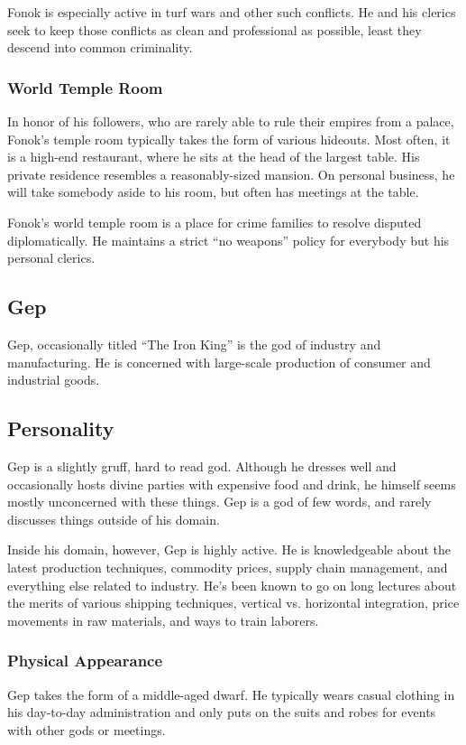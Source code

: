 Fonok is especially active in turf wars and other such conflicts.
He and his clerics seek to keep those conflicts as clean and professional as possible, least they descend into common criminality.

\subsubsection*{World Temple Room}
In honor of his followers, who are rarely able to rule their empires from a palace, Fonok's temple room typically takes the form of various hideouts.
Most often, it is a high-end restaurant, where he sits at the head of the largest table.
His private residence resembles a reasonably-sized mansion.
On personal business, he will take somebody aside to his room, but often has meetings at the table.

Fonok's world temple room is a place for crime families to resolve disputed diplomatically.
He maintains a strict ``no weapons'' policy for everybody but his personal clerics.

\subsection*{Gep}
\begin{goddesc}
\end{goddesc}

Gep, occasionally titled ``The Iron King'' is the god of industry and manufacturing.
He is concerned with large-scale production of consumer and industrial goods.

\subsection*{Personality}
Gep is a slightly gruff, hard to read god.
Although he dresses well and occasionally hosts divine parties with expensive food and drink, he himself seems mostly unconcerned with these things.
Gep is a god of few words, and rarely discusses things outside of his domain.

Inside his domain, however, Gep is highly active.
He is knowledgeable about the latest production techniques, commodity prices, supply chain management, and everything else related to industry.
He's been known to go on long lectures about the merits of various shipping techniques, vertical vs. horizontal integration, price movements in raw materials, and ways to train laborers.

\subsubsection*{Physical Appearance}
Gep takes the form of a middle-aged dwarf.
He typically wears casual clothing in his day-to-day administration and only puts on the suits and robes for events with other gods or meetings.

